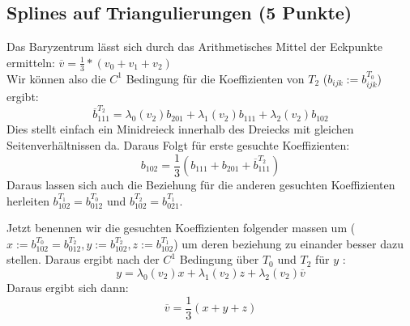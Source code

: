 \newif\ifvimbug

\vimbugfalse

\ifvimbug

\fi


\subsection{Splines auf Triangulierungen (5 Punkte)}
Das Baryzentrum lässt sich durch das Arithmetisches Mittel der Eckpunkte ermitteln: $\overline{v} = \frac{1}{3} * (v_0 + v_1 + v_2)$\\

Wir können also die $C^1$ Bedingung für die Koeffizienten von $T_2$ ($b_{ijk} := b_{ijk}^{T_0}$) ergibt:
$$ \overline{b}_{111}^{T_2} = \lambda_0(v_2) b_{201} + \lambda_1(v_2) b_{111} + \lambda_2(v_2) b_{102} $$
Dies stellt einfach ein Minidreieck innerhalb des Dreiecks mit gleichen Seitenverhältnissen da. Daraus Folgt für erste gesuchte Koeffizienten:
$$b_{102} = \frac{1}{3} (b_{111} + b_{201} + \overline{b}_{111}^{T_2})$$
Daraus lassen sich auch die Beziehung für die anderen gesuchten Koeffizienten herleiten $b_{102}^{T_1} = b_{012}^{T_0}$ und $b_{102}^{T_2} = b_{021}^{T_1}$.

Jetzt benennen wir die gesuchten Koeffizienten folgender massen um ($x := b_{102}^{T_0} = b_{012}^{T_2}, y :=  b_{102}^{T_2}, z:=b_{102}^{T_1}$) um deren beziehung zu einander besser dazu stellen. Daraus ergibt nach der $C^1$ Bedingung über $T_0$ und $T_2$ für $y$ :
$$ y = \lambda_0(v_2) x + \lambda_1(v_2) z + \lambda_2(v_2) \overline{v} $$
 Daraus ergibt sich dann:
$$\overline{v} = \frac{1}{3} (x + y + z)$$



